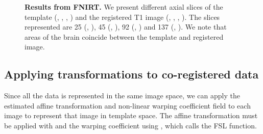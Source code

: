 \begin{figure}
{} \hspace*{-0.9em}
   \hspace*{-0.9em}
   \hspace*{-0.9em}
  \hspace*{-0.9em}
\caption[{\bf Results from FNIRT.}]{{\bf Results from FNIRT.} We present different axial slices of the template (\protect{}, \protect{}, \protect{}, \protect{}) and the registered T1 image (\protect{}, \protect{}, \protect{}, \protect{}).  The slices represented are 25 (\protect{}, \protect{}), 45 (\protect{}, \protect{}), 92 (\protect{}, \protect{}) and 137 (\protect{}, \protect{}).  We note that areas of the brain coincide between the template and registered image.}
\label{fig:fnirt_slice}
\end{figure}



\subsection{Applying transformations to co-registered data}
Since all the data is represented in the same image space, we can apply the estimated affine transformation and non-linear warping coefficient field to each image to represent that image in template space.  The affine transformation must be applied with  and the warping coefficient using , which calls the FSL  function.  



